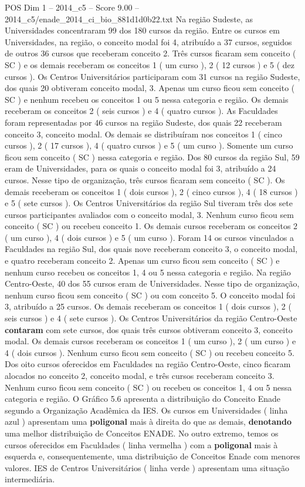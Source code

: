 \begin{textsample}{POS Dim 1 – 2014\_c5 – Score 9.00 – 2014\_c5/enade\_2014\_ci\_bio\_881d1d0b22.txt}
Na região Sudeste, as Universidades concentraram 99 dos 180 cursos da região.
Entre os cursos em Universidades, na região, o conceito modal foi 4, atribuído a 37 cursos, seguidos de outros 36 cursos que receberam conceito 2.
Três cursos ficaram sem conceito ( SC ) e os demais receberam os conceitos 1 ( um curso ), 2 ( 12 cursos ) e 5 ( dez cursos ).
Os Centros Universitários participaram com 31 cursos na região Sudeste, dos quais 20 obtiveram conceito modal, 3.
Apenas um curso ficou sem conceito ( SC ) e nenhum recebeu os conceitos 1 ou 5 nessa categoria e região.
Os demais receberam os conceitos 2 ( seis cursos ) e 4 ( quatro cursos ).
As Faculdades foram representadas por 46 cursos na região Sudeste, dos quais 22 receberam conceito 3, conceito modal.
Os demais se distribuíram nos conceitos 1 ( cinco cursos ), 2 ( 17 cursos ), 4 ( quatro cursos ) e 5 ( um curso ).
Somente um curso ficou sem conceito ( SC ) nessa categoria e região.
Dos 80 cursos da região Sul, 59 eram de Universidades, para os quais o conceito modal foi 3, atribuído a 24 cursos.
Nesse tipo de organização, três cursos ficaram sem conceito ( SC ).
Os demais receberam os conceitos 1 ( dois cursos ), 2 ( cinco cursos ), 4 ( 18 cursos ) e 5 ( sete cursos ).
Os Centros Universitários da região Sul tiveram três dos sete cursos participantes avaliados com o conceito modal, 3.
Nenhum curso ficou sem conceito ( SC ) ou recebeu conceito 1.
Os demais cursos receberam os conceitos 2 ( um curso ), 4 ( dois cursos ) e 5 ( um curso ).
Foram 14 os cursos vinculados a Faculdades na região Sul, dos quais nove receberam conceito 3, o conceito modal, e quatro receberam conceito 2.
Apenas um curso ficou sem conceito ( SC ) e nenhum curso recebeu os conceitos 1, 4 ou 5 nessa categoria e região.
Na região Centro-Oeste, 40 dos 55 cursos eram de Universidades.
Nesse tipo de organização, nenhum curso ficou sem conceito ( SC ) ou com conceito 5.
O conceito modal foi 3, atribuído a 25 cursos.
Os demais receberam os conceitos 1 ( dois cursos ), 2 ( seis cursos ) e 4 ( sete cursos ).
Os Centros Universitários da região Centro-Oeste \textbf{contaram} com sete cursos, dos quais três cursos obtiveram conceito 3, conceito modal.
Os demais cursos receberam os conceitos 1 ( um curso ), 2 ( um curso ) e 4 ( dois cursos ).
Nenhum curso ficou sem conceito ( SC ) ou recebeu conceito 5.
Dos oito cursos oferecidos em Faculdades na região Centro-Oeste, cinco ficaram alocados no conceito 2, conceito modal, e três cursos receberam conceito 3.
Nenhum curso ficou sem conceito ( SC ) ou recebeu os conceitos 1, 4 ou 5 nessa categoria e região.
O Gráfico 5.6 apresenta a distribuição do Conceito Enade segundo a Organização Acadêmica da IES.
Os cursos em Universidades ( linha azul ) apresentam uma \textbf{poligonal} mais à direita do que as demais, \textbf{denotando} uma melhor distribuição de Conceitos ENADE.
No outro extremo, temos os cursos oferecidos em Faculdades ( linha vermelha ) com a \textbf{poligonal} mais à esquerda e, consequentemente, uma distribuição de Conceitos Enade com menores valores.
IES de Centros Universitários ( linha verde ) apresentam uma situação intermediária.


\end{textsample}
